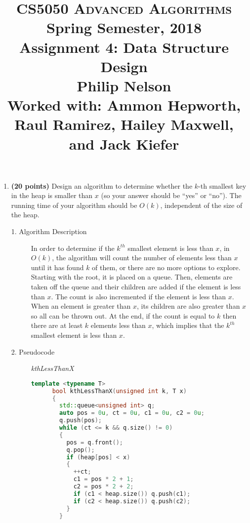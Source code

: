 \documentclass[11pt]{article}
\begin{document}
\baselineskip=14.0pt

\title{CS5050 \textsc{Advanced Algorithms}
\\{\large Spring Semester, 2018}
\\ Assignment 4: Data Structure Design
\\ {\bf Philip Nelson}
\\ {\large Worked with: Ammon Hepworth, Raul Ramirez, Hailey Maxwell, and Jack Kiefer}}
\date{}

\maketitle

\vspace{-0.8in}

\begin{enumerate}
\item %
{\bf (20 points)}
Design an algorithm to determine whether the $k$-th smallest key in the heap is smaller than $x$ (so your answer should be ``yes'' or ``no''). The running time of your algorithm should be $O(k)$, independent of the size of the heap.

\begin{description}
  \item[1. Algorithm Description]

    In order to determine if the $k^{th}$ smallest element is less than $x$, in $O(k)$, the algorithm will count the number of elements less than $x$ until it has found $k$ of them, or there are no more options to explore. Starting with the root, it is placed on a queue. Then, elements are taken off the queue and their children are added if the element is less than $x$. The count is also incremented if the element is less than $x$. When an element is greater than $x$, its children are also greater than $x$ so all can be thrown out. At the end, if the count is equal to $k$ then there are at least $k$ elements less than $x$, which implies that the $k^{th}$ smallest element is less than $x$.


  \item[2. Pseudocode]
    \textit{kthLessThanX}
    \begin{lstlisting}[language=C++]
      template <typename T>
      bool kthLessThanX(unsigned int k, T x)
      {
        std::queue<unsigned int> q;
        auto pos = 0u, ct = 0u, c1 = 0u, c2 = 0u;
        q.push(pos);
        while (ct <= k && q.size() != 0)
        {
          pos = q.front();
          q.pop();
          if (heap[pos] < x)
          {
            ++ct;
            c1 = pos * 2 + 1;
            c2 = pos * 2 + 2;
            if (c1 < heap.size()) q.push(c1);
            if (c2 < heap.size()) q.push(c2);
          }
        }


\end{lstlisting}
\end{description}
\end{enumerate}
\end{document}
